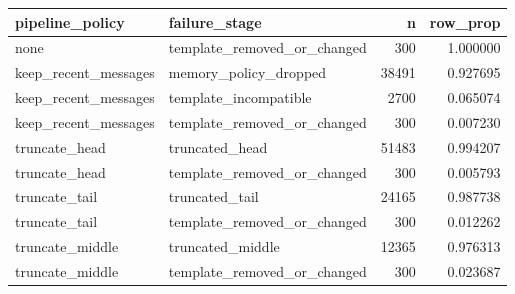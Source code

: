 \begin{tabular}{llrr}
\toprule
pipeline_policy & failure_stage & n & row_prop \\
\midrule
none & template_removed_or_changed & 300 & 1.000000 \\
keep_recent_messages & memory_policy_dropped & 38491 & 0.927695 \\
keep_recent_messages & template_incompatible & 2700 & 0.065074 \\
keep_recent_messages & template_removed_or_changed & 300 & 0.007230 \\
truncate_head & truncated_head & 51483 & 0.994207 \\
truncate_head & template_removed_or_changed & 300 & 0.005793 \\
truncate_tail & truncated_tail & 24165 & 0.987738 \\
truncate_tail & template_removed_or_changed & 300 & 0.012262 \\
truncate_middle & truncated_middle & 12365 & 0.976313 \\
truncate_middle & template_removed_or_changed & 300 & 0.023687 \\
\bottomrule
\end{tabular}
